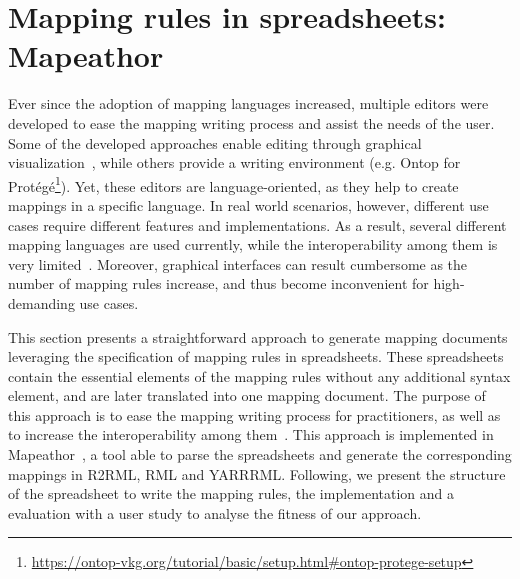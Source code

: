 \section{Mapping rules in spreadsheets: Mapeathor}
\label{sec:chp5_mapeathor}

Ever since the adoption of mapping languages increased, multiple  editors were developed to ease the mapping writing process and assist the needs of the user. Some of the developed approaches enable editing through graphical visualization~\parencite{heyvaert2016rmleditor,sicilia2017map}, while others provide a writing environment (e.g. Ontop for Protégé\footnote{\url{https://ontop-vkg.org/tutorial/basic/setup.html\#ontop-protege-setup}}). Yet, these editors are language-oriented, as they help to create mappings in a specific language. In real world scenarios, however, different use cases require different features and implementations. As a result, several different mapping languages are used currently, while the interoperability among them is very limited~\parencite{iglesias2022devising}. Moreover, graphical interfaces can result cumbersome as the number of mapping rules increase, and thus become inconvenient for high-demanding use cases. 


This section presents a straightforward approach to generate mapping documents leveraging the specification of mapping rules in spreadsheets. These spreadsheets contain the essential elements of the mapping rules without any additional syntax element, and are later translated into one mapping document. The purpose of this approach is to ease the mapping writing process for practitioners, as well as to increase the interoperability among them~\parencite{corcho2020towards, iglesias2022devising}. This approach is implemented in Mapeathor~\parencite{iglesias-molina_2023_5973906}, a tool able to parse the spreadsheets and generate the corresponding mappings in R2RML, RML and YARRRML. Following, we present the structure of the spreadsheet to write the mapping rules, the implementation and a evaluation with a user study to analyse the fitness of our approach.

